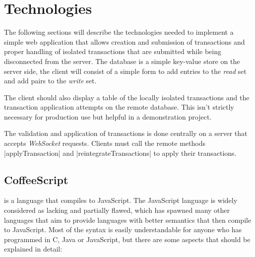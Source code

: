 
\chapter{Technologies}

The following sections will describe the technologies needed to implement a
simple web application that allows creation and submission of transactions and
proper handling of isolated transactions that are submitted while being
disconnected from the server. The database is a simple key-value store on the
server side, the client will consist of a simple form to add entries to the
\emph{read} set and add pairs to the \emph{write} set.

The client should also display a table of the locally isolated transactions and
the transaction application attempts on the remote database. This isn't strictly
necessary for production use but helpful in a demonstration project.

The validation and application of transactions is done centrally on a server
that accepts \emph{WebSocket} requests. Clients must call the remote methods
|applyTransaction| and |reintegrateTransactions| to apply their transactions.

\section{CoffeeScript}

 is a language that compiles to
JavaScript. The JavaScript language is widely considered as lacking and
partially flawed, which has spawned many other languages that aim to provide
languages with better semantics that then compile to JavaScript. Most of the
syntax is easily understandable for anyone who has programmed in C, Java or
JavaScript, but there are some aspects that should be explained in detail:

